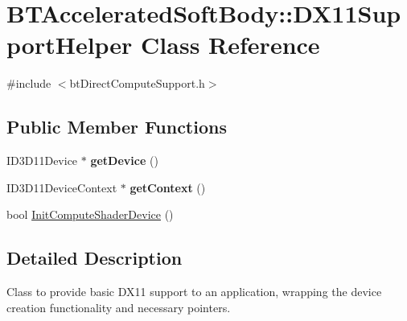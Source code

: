 \hypertarget{class_b_t_accelerated_soft_body_1_1_d_x11_support_helper}{\section{B\+T\+Accelerated\+Soft\+Body\+:\+:D\+X11\+Support\+Helper Class Reference}
\label{class_b_t_accelerated_soft_body_1_1_d_x11_support_helper}
}


{\ttfamily \#include $<$bt\+Direct\+Compute\+Support.\+h$>$}

\subsection*{Public Member Functions}
\begin{DoxyCompactItemize}
\item 
\hypertarget{class_b_t_accelerated_soft_body_1_1_d_x11_support_helper_a535255c63ab813ba71d1fe207773c4b8}{I\+D3\+D11\+Device $\ast$ {\bfseries get\+Device} ()}\label{class_b_t_accelerated_soft_body_1_1_d_x11_support_helper_a535255c63ab813ba71d1fe207773c4b8}

\item 
\hypertarget{class_b_t_accelerated_soft_body_1_1_d_x11_support_helper_a3ebd89f1833a346b82d828f3f8354709}{I\+D3\+D11\+Device\+Context $\ast$ {\bfseries get\+Context} ()}\label{class_b_t_accelerated_soft_body_1_1_d_x11_support_helper_a3ebd89f1833a346b82d828f3f8354709}

\item 
bool \hyperlink{class_b_t_accelerated_soft_body_1_1_d_x11_support_helper_a76d79e9b4407249e7d22c7c1606bc6f1}{Init\+Compute\+Shader\+Device} ()
\end{DoxyCompactItemize}


\subsection{Detailed Description}
Class to provide basic D\+X11 support to an application, wrapping the device creation functionality and necessary pointers. 

